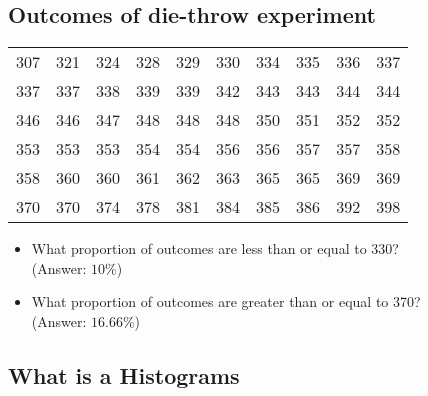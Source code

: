 \documentclass[]{report}
\begin{document}
{
\subsection{Outcomes of die-throw experiment}
\small
\begin{center}
\begin{tabular}{|c c c c c c c c c c|}
\hline
307 & 321 & 324 & 328 & 329 & 330 & 334 & 335 & 336 &337 \\
337 & 337 & 338 & 339 & 339 & 342 & 343 & 343 & 344 &344 \\
346 & 346 & 347 & 348 & 348 & 348 & 350 & 351 & 352 &352 \\
353 & 353 & 353 & 354 & 354 & 356 & 356 & 357 & 357 &358 \\
358 & 360 & 360 & 361 & 362 & 363 & 365 & 365 & 369 &369 \\
370 & 370 & 374 & 378 & 381 & 384 & 385 & 386 & 392 &398 \\
\hline
\end{tabular}
\end{center}
\normalsize
\begin{itemize}
\item What proportion of outcomes are less than or equal to 330? \\ (Answer: $10\%$)
\item What proportion of outcomes are greater than or equal to 370?\\ (Answer: $16.66\%$)
\end{itemize}
}

{
\subsection{What is a Histograms}



}
\end{document}
